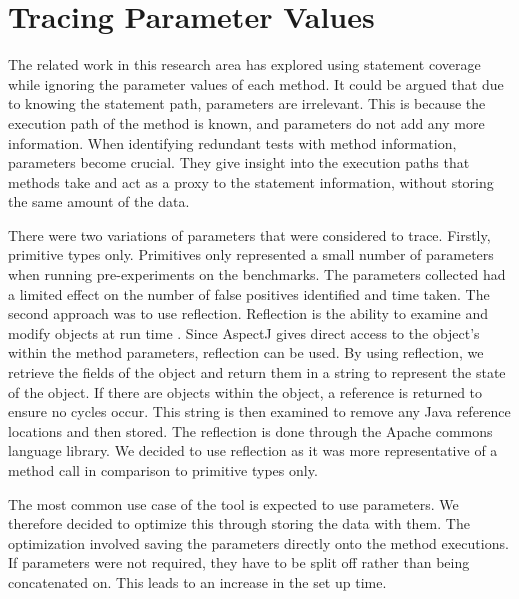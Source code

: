 \section{Tracing Parameter Values}
\label{parameterTrace}
The related work in this research area has explored using statement coverage while ignoring the parameter values of each method. It could be argued that due to knowing the statement path, parameters are irrelevant. This is because the execution path of the method is known, and parameters do not add any more information. When identifying redundant tests with method information, parameters become crucial. They give insight into the execution paths that methods take and act as a proxy to the statement information, without storing the same amount of the data.

There were two variations of parameters that were considered to trace. Firstly, primitive types only. Primitives only represented a small number of parameters when running pre-experiments on the benchmarks.  The parameters collected had a limited effect on the number of false positives identified and time taken. The second approach was to use reflection. Reflection is the ability to examine and modify objects at run time \cite{oraclereflection}. Since AspectJ gives direct access to the object's within the method parameters, reflection can be used. By using reflection, we retrieve the fields of the object and return them in a string to represent the state of the object. If there are objects within the object, a reference is returned to ensure no cycles occur. This string is then examined to remove any Java reference locations and then stored. The reflection is done through the Apache commons language library. We decided to use reflection as it was more representative of a method call in comparison to primitive types only.

The most common use case of the tool is expected to use parameters. We therefore decided to optimize this through storing the data with them. The optimization involved saving the parameters directly onto the method executions. If parameters were not required, they have to be split off rather than being concatenated on. This leads to an increase in the set up time.

